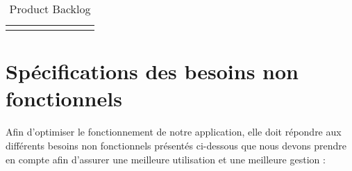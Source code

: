 \begin{landscape}
\begin{adjustwidth}{-1cm}{}
\begin{longtable}{|c|p{3cm}|p{8cm}|c|c|p{2cm}|p{2cm}|c|}




    \hline
        \caption{Product Backlog}
        \label{tab:product_backlog}
      
      \end{longtable}
    \end{adjustwidth}
\end{landscape}

\section{Spécifications des besoins non fonctionnels}
Afin d'optimiser le fonctionnement de notre application, elle doit répondre aux différents besoins non fonctionnels présentés ci-dessous que nous devons prendre en compte afin d'assurer une meilleure utilisation et une meilleure gestion :

